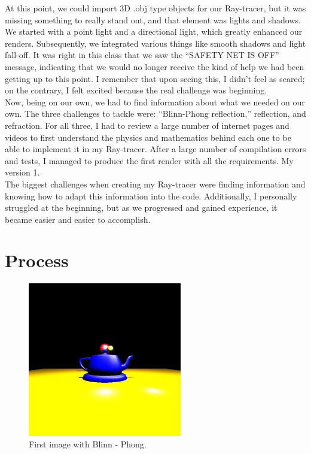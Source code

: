 \documentclass[12pt]{article}
\begin{document}
	At this point, we could import 3D .obj type objects for our Ray-tracer, but it was missing something to really stand out, and that element was lights and shadows. We started with a point light and a directional light, which greatly enhanced our renders. Subsequently, we integrated various things like smooth shadows and light fall-off. It was right in this class that we saw the “SAFETY NET IS OFF” message, indicating that we would no longer receive the kind of help we had been getting up to this point. I remember that upon seeing this, I didn’t feel as scared; on the contrary, I felt excited because the real challenge was beginning.\\
	
	
	
	Now, being on our own, we had to find information about what we needed on our own. The three challenges to tackle were: “Blinn-Phong reflection,” reflection, and refraction. For all three, I had to review a large number of internet pages and videos to first understand the physics and mathematics behind each one to be able to implement it in my Ray-tracer. After a large number of compilation errors and tests, I managed to produce the first render with all the requirements. My version 1.\\
	
	The biggest challenges when creating my Ray-tracer were finding information and knowing how to adapt this information into the code. Additionally, I personally struggled at the beginning, but as we progressed and gained experience, it became easier and easier to accomplish.\\
	
	
	
	
	
	
	
	\section{Process}
	
	\begin{figure}[h]
		\centering
		\includegraphics[width=0.6\textwidth]{image.png}
		\caption{First image with Blinn - Phong.}
		\label{fig:image1}
	\end{figure}
	
\end{document}
